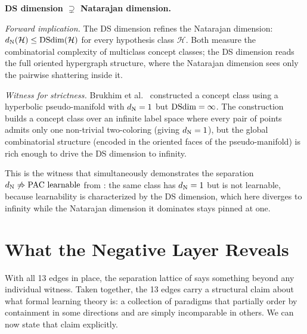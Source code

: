 \begin{separation}
\textbf{DS dimension $\supsetneq$ Natarajan dimension.}

\medskip\noindent
\emph{Forward implication.}
The DS dimension refines the Natarajan dimension: $d_{\mathrm{N}}(\mathcal{H})
\leq \mathrm{DSdim}(\mathcal{H})$ for every hypothesis class $\mathcal{H}$.
Both measure the combinatorial complexity of multiclass concept classes;
the DS dimension reads the full oriented hypergraph structure, where the
Natarajan dimension sees only the pairwise shattering inside it.

\medskip\noindent
\emph{Witness for strictness.}
Brukhim et al.~\cite{BrukhimCarmonDinurMoranYehudayoff2022} constructed
a concept class using a hyperbolic pseudo-manifold with $d_{\mathrm{N}} = 1$
but $\mathrm{DSdim} = \infty$. The construction builds a concept class over an
infinite label space where every pair of points admits only one
non-trivial two-coloring (giving $d_{\mathrm{N}} = 1$), but the global
combinatorial structure (encoded in the oriented faces of the
pseudo-manifold) is rich enough to drive the DS dimension to infinity.

This is the witness that simultaneously demonstrates the separation
$d_{\mathrm{N}} \not\Rightarrow \text{PAC learnable}$ from :
the same class has $d_{\mathrm{N}} = 1$ but is not learnable, because learnability
is characterized by the DS dimension, which here diverges to infinity while
the Natarajan dimension it dominates stays pinned at one.

\hfill\cite{BrukhimCarmonDinurMoranYehudayoff2022}
\end{separation}



\section{What the Negative Layer Reveals}
\label{sec:neg-layer-summary}

With all 13 edges in place, the separation lattice of
 says something beyond any individual
witness. Taken together, the 13 edges carry a structural claim about
what formal learning theory is: a collection of paradigms that partially
order by containment in some directions and are simply incomparable in
others. We can now state that claim explicitly.

